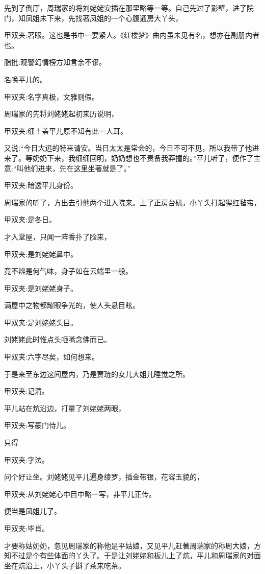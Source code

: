 \begin{parag}
    先到了倒厅，周瑞家的将刘姥姥安插在那里略等一等。自己先过了影壁，进了院门，知凤姐未下来，先找著凤姐的一个心腹通房大丫头，\begin{note}甲双夹:著眼。这也是书中一要紧人。《红楼梦》曲内虽未见有名，想亦在副册内者也。\end{note}\begin{note}脂批:观警幻情榜方知言余不谬。\end{note}名唤平儿的。\begin{note}甲双夹:名字真极，文雅则假。\end{note}周瑞家的先将刘姥姥起初来历说明，\begin{note}甲双夹:细！盖平儿原不知有此一人耳。\end{note}又说:“今日大远的特来请安。当日太太是常会的，今日不可不见，所以我带了他进来了。等奶奶下来，我细细回明，奶奶想也不责备我莽撞的。”平儿听了，便作了主意:“叫他们进来，先在这里坐著就是了。”\begin{note}甲双夹:暗透平儿身份。\end{note}周瑞家的听了，方出去引他两个进入院来。上了正房台矶，小丫头打起猩红毡帘，\begin{note}甲双夹:是冬日。\end{note}才入堂屋，只闻一阵香扑了脸来，\begin{note}甲双夹:是刘姥姥鼻中。 \end{note}竟不辨是何气味，身子如在云端里一般。\begin{note}甲双夹:是刘姥姥身子。 \end{note}满屋中之物都耀眼争光的，使人头悬目眩。\begin{note}甲双夹:是刘姥姥头目。\end{note}刘姥姥此时惟点头咂嘴念佛而已。\begin{note}甲双夹:六字尽矣，如何想来。\end{note}于是来至东边这间屋内，乃是贾琏的女儿大姐儿睡觉之所。\begin{note}甲双夹:记清。\end{note}平儿站在炕沿边，打量了刘姥姥两眼，\begin{note}甲双夹:写豪门侍儿。\end{note}只得\begin{note}甲双夹:字法。\end{note}问个好让坐。刘姥姥见平儿遍身绫罗，插金带银，花容玉貌的，\begin{note}甲双夹:从刘姥姥心中目中略一写，非平儿正传。 \end{note}便当是凤姐儿了。\begin{note}甲双夹:毕肖。\end{note}才要称姑奶奶，忽见周瑞家的称他是平姑娘，又见平儿赶著周瑞家的称周大娘，方知不过是个有些体面的丫头了。于是让刘姥姥和板儿上了炕，平儿和周瑞家的对面坐在炕沿上，小丫头子斟了茶来吃茶。
\end{parag}


